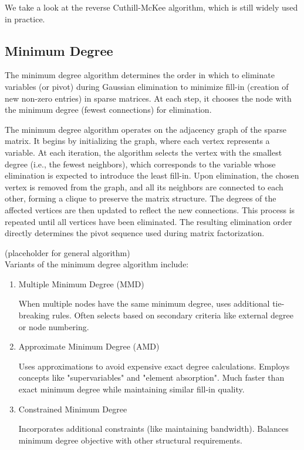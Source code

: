 We take a look at the reverse Cuthill-McKee algorithm, which is still widely used in practice. 

\subsection{Minimum Degree}

The minimum degree algorithm determines the order in which to eliminate variables (or pivot) during Gaussian elimination to minimize fill-in (creation of new non-zero entries) in sparse matrices. At each step, it chooses the node with the minimum degree (fewest connections) for elimination.

The minimum degree algorithm operates on the adjacency graph of the sparse matrix. It begins by initializing the graph, where each vertex represents a variable. At each iteration, the algorithm selects the vertex with the smallest degree (i.e., the fewest neighbors), which corresponds to the variable whose elimination is expected to introduce the least fill-in. Upon elimination, the chosen vertex is removed from the graph, and all its neighbors are connected to each other, forming a clique to preserve the matrix structure. The degrees of the affected vertices are then updated to reflect the new connections. This process is repeated until all vertices have been eliminated. The resulting elimination order directly determines the pivot sequence used during matrix factorization.

(placeholder for general algorithm) \\

Variants of the minimum degree algorithm include:

\begin{enumerate}
    \item Multiple Minimum Degree (MMD)

    When multiple nodes have the same minimum degree, uses additional tie-breaking rules. Often selects based on secondary criteria like external degree or node numbering.

    \item Approximate Minimum Degree (AMD)

    Uses approximations to avoid expensive exact degree calculations. Employs concepts like "supervariables" and "element absorption". Much faster than exact minimum degree while maintaining similar fill-in quality.

    \item Constrained Minimum Degree

    Incorporates additional constraints (like maintaining bandwidth). Balances minimum degree objective with other structural requirements.

\end{enumerate}

